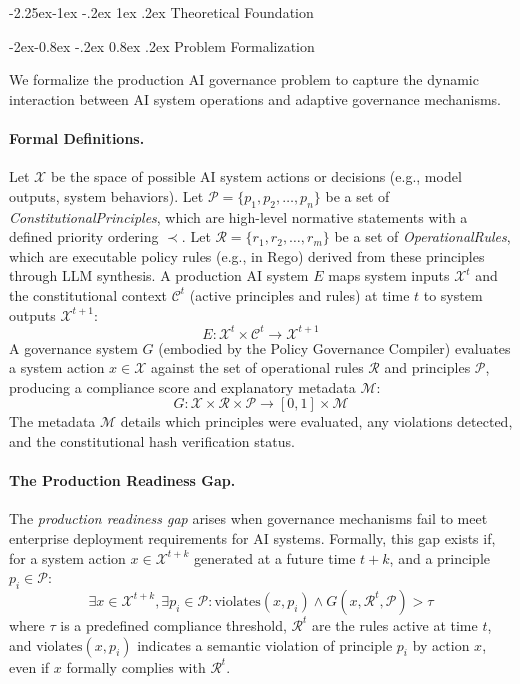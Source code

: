 \documentclass[manuscript,screen,9pt]{acmart}
\makeatletter
\renewcommand\subsection{\@startsection{subsection}{2}{\z@}%
  {-2.25ex\@plus -1ex \@minus -.2ex}%
  {1ex \@plus .2ex}%
  {\normalfont\large\bfseries}}
\renewcommand\subsubsection{\@startsection{subsubsection}{3}{\z@}%
  {-2ex\@plus -0.8ex \@minus -.2ex}%
  {0.8ex \@plus .2ex}%
  {\normalfont\normalsize\bfseries}}
\makeatother
\begin{document}
\subsection{Theoretical Foundation}
\label{subsec:theoretical_foundation}

\subsubsection{Problem Formalization}
\label{subsubsec:problem_formalization}

We formalize the production AI governance problem to capture the dynamic interaction between AI system operations and adaptive governance mechanisms.

\paragraph{Formal Definitions.} Let $\mathcal{X}$ be the space of possible AI system actions or decisions (e.g., model outputs, system behaviors). Let $\mathcal{P} = \{p_1, p_2, \ldots, p_n\}$ be a set of \textit{ConstitutionalPrinciples}, which are high-level normative statements with a defined priority ordering $\prec$. Let $\mathcal{R} = \{r_1, r_2, \ldots, r_m\}$ be a set of \textit{OperationalRules}, which are executable policy rules (e.g., in Rego) derived from these principles through LLM synthesis. A production AI system $E$ maps system inputs $\mathcal{X}^t$ and the constitutional context $\mathcal{C}^t$ (active principles and rules) at time $t$ to system outputs $\mathcal{X}^{t+1}$:
\begin{equation}
	E: \mathcal{X}^t \times \mathcal{C}^t \rightarrow \mathcal{X}^{t+1}
\end{equation}
A governance system $G$ (embodied by the Policy Governance Compiler) evaluates a system action $x \in \mathcal{X}$ against the set of operational rules $\mathcal{R}$ and principles $\mathcal{P}$, producing a compliance score and explanatory metadata $\mathcal{M}$:
\begin{equation}
	G: \mathcal{X} \times \mathcal{R} \times \mathcal{P} \rightarrow [0,1] \times \mathcal{M}
\end{equation}
The metadata $\mathcal{M}$ details which principles were evaluated, any violations detected, and the constitutional hash verification status.

\paragraph{The Production Readiness Gap.} The \textit{production readiness gap} arises when governance mechanisms fail to meet enterprise deployment requirements for AI systems. Formally, this gap exists if, for a system action $x \in \mathcal{X}^{t+k}$ generated at a future time $t+k$, and a principle $p_i \in \mathcal{P}$:
\[\exists x \in \mathcal{X}^{t+k}, \exists p_i \in \mathcal{P}: \text{violates}(x, p_i) \land G(x, \mathcal{R}^t, \mathcal{P}) > \tau\]
where $\tau$ is a predefined compliance threshold, $\mathcal{R}^t$ are the rules active at time $t$, and $\text{violates}(x, p_i)$ indicates a semantic violation of principle $p_i$ by action $x$, even if $x$ formally complies with $\mathcal{R}^t$.
\end{document}

